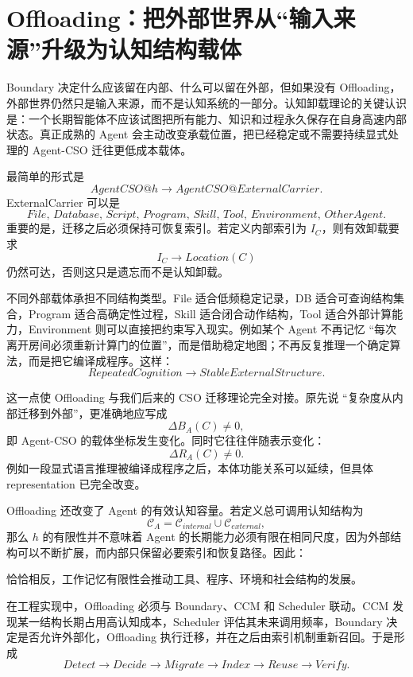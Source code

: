\section{Offloading：把外部世界从“输入来源”升级为认知结构载体}

Boundary 决定什么应该留在内部、什么可以留在外部，但如果没有 Offloading，外部世界仍然只是输入来源，而不是认知系统的一部分。认知卸载理论的关键认识是：一个长期智能体不应该试图把所有能力、知识和过程永久保存在自身高速内部状态。真正成熟的 Agent 会主动改变承载位置，把已经稳定或不需要持续显式处理的 Agent-CSO 迁往更低成本载体。

最简单的形式是
\[
AgentCSO@h
\rightarrow
AgentCSO@ExternalCarrier.
\]
ExternalCarrier 可以是
\[
File,\,
Database,\,
Script,\,
Program,\,
Skill,\,
Tool,\,
Environment,\,
OtherAgent.
\]
重要的是，迁移之后必须保持可恢复索引。若定义内部索引为 $I_C$，则有效卸载要求
\[
I_C
\rightarrow
Location(C)
\]
仍然可达，否则这只是遗忘而不是认知卸载。

不同外部载体承担不同结构类型。File 适合低频稳定记录，DB 适合可查询结构集合，Program 适合高确定性过程，Skill 适合闭合动作结构，Tool 适合外部计算能力，Environment 则可以直接把约束写入现实。例如某个 Agent 不再记忆 ``每次离开房间必须重新计算门的位置''，而是借助稳定地图；不再反复推理一个确定算法，而是把它编译成程序。这样：
\[
RepeatedCognition
\rightarrow
StableExternalStructure.
\]

这一点使 Offloading 与我们后来的 CSO 迁移理论完全对接。原先说 ``复杂度从内部迁移到外部''，更准确地应写成
\[
\Delta B_A(C)\neq 0,
\]
即 Agent-CSO 的载体坐标发生变化。同时它往往伴随表示变化：
\[
\Delta R_A(C)\neq 0.
\]
例如一段显式语言推理被编译成程序之后，本体功能关系可以延续，但具体 representation 已完全改变。

Offloading 还改变了 Agent 的有效认知容量。若定义总可调用认知结构为
\[
\mathcal C_A
=
\mathcal C_{internal}
\cup
\mathcal C_{external},
\]
那么 $h$ 的有限性并不意味着 Agent 的长期能力必须有限在相同尺度，因为外部结构可以不断扩展，而内部只保留必要索引和恢复路径。因此：
\begin{statementbox}
\centering
{}
\end{statementbox}
恰恰相反，工作记忆有限性会推动工具、程序、环境和社会结构的发展。

在工程实现中，Offloading 必须与 Boundary、CCM 和 Scheduler 联动。CCM 发现某一结构长期占用高认知成本，Scheduler 评估其未来调用频率，Boundary 决定是否允许外部化，Offloading 执行迁移，并在之后由索引机制重新召回。于是形成
\[
Detect
\rightarrow
Decide
\rightarrow
Migrate
\rightarrow
Index
\rightarrow
Reuse
\rightarrow
Verify.
\]


